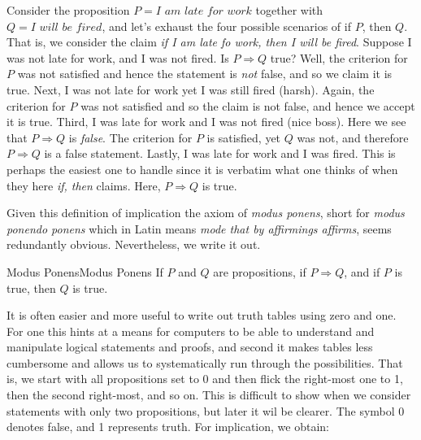         \begin{example}
            Consider the proposition $P=\textit{I am late for work}$ together
            with $Q=\textit{I will be fired}$, and let's exhaust the four
            possible scenarios of if $P$, then $Q$. That is, we consider the
            claim \textit{if I am late fo work, then I will be fired}. Suppose
            I was not late for work, and I was not fired. Is $P\Rightarrow{Q}$
            true? Well, the criterion for $P$ was not satisfied and hence the
            statement is \textit{not} false, and so we claim it is true. Next, I
            was not late for work yet I was still fired (harsh). Again, the
            criterion for $P$ was not satisfied and so the claim is not false,
            and hence we accept it is true. Third, I was late for work and I was
            not fired (nice boss). Here we see that $P\Rightarrow{Q}$ is
            \textit{false}. The criterion for $P$ is satisfied, yet $Q$ was not,
            and therefore $P\Rightarrow{Q}$ is a false statement. Lastly, I was
            late for work and I was fired. This is perhaps the easiest one to
            handle since it is verbatim what one thinks of when they here
            \textit{if, then} claims. Here, $P\Rightarrow{Q}$ is true.
        \end{example}
        Given this definition of implication the axiom of \textit{modus ponens},
        short for \textit{modus ponendo ponens} which in Latin means
        \textit{mode that by affirmings affirms}, seems redundantly obvious.
        Nevertheless, we write it out.
        \begin{faxiom}{Modus Ponens}{Modus Ponens}
            If $P$ and $Q$ are propositions, if $P\Rightarrow{Q}$, and if $P$ is
            true, then $Q$ is true.
        \end{faxiom}
        It is often easier and more useful to write out truth tables using
        zero and one. For one this hints at a means for computers to be able to
        understand and manipulate logical statements and proofs, and second it
        makes tables less cumbersome and allows us to systematically run through
        the possibilities. That is, we start with all propositions set to 0 and
        then flick the right-most one to 1, then the second right-most, and so
        on. This is difficult to show when we consider statements with only two
        propositions, but later it wil be clearer. The symbol 0 denotes false,
        and 1 represents truth. For implication, we obtain:
